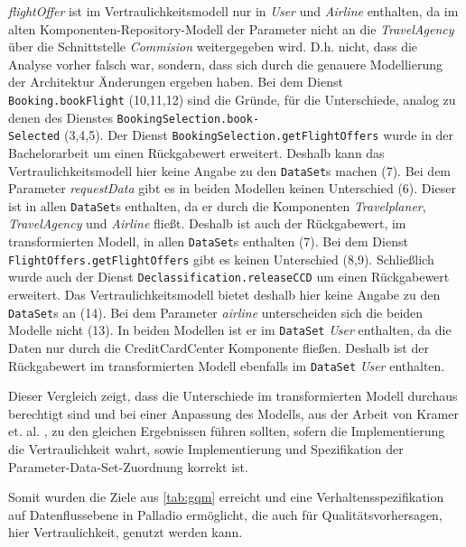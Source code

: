 \textit{flightOffer} ist im Vertraulichkeitsmodell nur in \textit{User} und \textit{Airline} enthalten, da im alten Komponenten-Repository-Modell der Parameter nicht an die \textit{TravelAgency} über die Schnittstelle \textit{Commision} weitergegeben wird. D.h. nicht, dass die Analyse vorher falsch war, sondern, dass sich durch die genauere Modellierung der Architektur Änderungen ergeben haben. Bei dem Dienst \texttt{Booking.bookFlight} (10,11,12) sind die Gründe, für die Unterschiede, analog zu denen des Dienstes \texttt{BookingSelection.book-\\Selected} (3,4,5). Der Dienst \texttt{BookingSelection.getFlightOffers} wurde in der Bachelorarbeit um einen Rückgabewert erweitert. Deshalb kann das Vertraulichkeitsmodell hier keine Angabe zu den \texttt{DataSet}s machen (7). Bei dem Parameter \textit{requestData} gibt es in beiden Modellen keinen Unterschied (6). Dieser ist in allen \texttt{DataSet}s enthalten, da er durch die Komponenten \textit{Travelplaner}, \textit{TravelAgency} und \textit{Airline} fließt. Deshalb ist auch der Rückgabewert, im transformierten Modell, in allen \texttt{DataSet}s enthalten (7). Bei dem Dienst \texttt{FlightOffers.getFlightOffers} gibt es keinen Unterschied (8,9). Schließlich wurde auch der Dienst \texttt{Declassification.releaseCCD} um einen Rückgabewert erweitert. Das Vertraulichkeitsmodell bietet deshalb hier keine Angabe zu den \texttt{DataSet}s an (14). Bei dem Parameter \textit{airline} unterscheiden sich die beiden Modelle nicht (13). In beiden Modellen ist er im \texttt{DataSet} \textit{User} enthalten, da die Daten nur durch die CreditCardCenter Komponente fließen. Deshalb ist der Rückgabewert im transformierten Modell ebenfalls im \texttt{DataSet} \textit{User} enthalten. \par
Dieser Vergleich zeigt, dass die Unterschiede im transformierten Modell durchaus berechtigt sind und bei einer Anpassung des Modells, aus der Arbeit von Kramer et. al. \cite{Kramera}, zu den gleichen Ergebnissen führen sollten, sofern die Implementierung die Vertraulichkeit wahrt, sowie Implementierung und Spezifikation der Parameter-Data-Set-Zuordnung korrekt ist. \par 
Somit wurden die Ziele aus \autoref{tab:gqm} erreicht und eine Verhaltensspezifikation auf Datenflussebene in Palladio ermöglicht, die auch für Qualitätsvorhersagen, hier Vertraulichkeit, genutzt werden kann. \par
